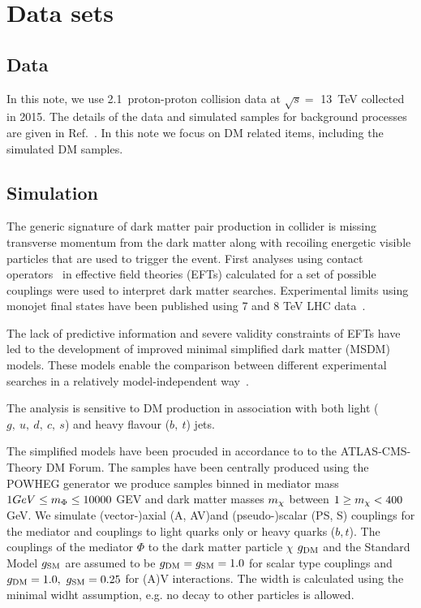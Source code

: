 \section{Data sets}
\label{sec:datasets}

\subsection{Data}


In this note, we use 2.1~\ifb proton-proton collision data at $\sqrt{s} =$ 13~TeV collected in 2015. The details of the data and
simulated samples for background processes are given in Ref.~\cite{alphaTnote}. In this note we focus on DM related items, including the simulated DM samples. 

\subsection{Simulation}

The generic signature of dark matter pair production in collider is missing transverse momentum from the dark matter along with recoiling energetic visible particles that are used to trigger the event. First analyses using contact operators~\cite{Goodman:2010ku} in effective field theories (EFTs) calculated for a set of possible
couplings were used to interpret dark matter searches. Experimental limits using
monojet final states have been published using 7 and 8 TeV LHC 
data~\cite{Chatrchyan:2012me,ATLAS:2012ky}. 

The lack of predictive information and severe validity constraints of EFTs have
led to the development of improved minimal simplified dark matter (MSDM) models.
These models enable the comparison between different experimental
searches in a relatively model-independent way~\cite{Buchmueller:2014yoa}.

The \alphat analysis is sensitive to DM production in association with both
light ($g,~u,~d,~c,~s$) and heavy flavour ($b,~t$) jets. 

The simplified models have been procuded in accordance to to the ATLAS-CMS-Theory DM Forum. The samples have been centrally produced using the \textsc{POWHEG} generator
we produce samples binned in mediator mass $1 GeV \le m_{\Phi}\le 10000$ GEV and dark matter masses $m_{\chi}$ between $1 \ge m_{\chi} < 400$ GeV. We simulate (vector-)axial (A, AV)and (pseudo-)scalar (PS, S)
couplings for the mediator and couplings to light quarks only or heavy quarks ($b, t$). The couplings of the mediator $\Phi$ to the dark matter particle $\chi$ $g_{\textrm{DM}}$ and the Standard Model $g_{\textrm{SM}}$ are assumed to be $g_{\textrm{DM}}=g_{\textrm{SM}}=1.0$ for scalar type couplings and $g_{\textrm{DM}}=1.0,~g_{\textrm{SM}}=0.25$ for (A)V interactions. The width is calculated using the minimal widht assumption, e.g. no decay to other particles is allowed.

